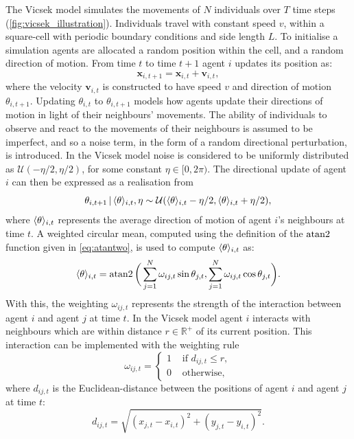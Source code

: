 The Vicsek model simulates the movements of $N$ individuals over $T$ time steps
(\cref{fig:vicsek_illustration}). Individuals travel with constant speed $v$,
within a square-cell with periodic boundary conditions and side length $L$. To
initialise a simulation agents are allocated a random position within the cell,
and a random direction of motion. From time $t$ to time $t+1$ agent $i$ updates
its position as:
\begin{equation}
  \label{eq:positional_update}
  \bm{x}_{i, t+1} = \bm{x}_{i, t} + \bm{v}_{i, t},
\end{equation}
where the velocity $\bm{v}_{i,t}$ is constructed to have speed $v$ and
direction of motion $\theta_{i, t+1}$. Updating $\theta_{i,t}$ to $\theta_{i,
t+1}$ models how agents update their directions of motion in light of their
neighbours' movements. The ability of individuals to observe and react to the
movements of their neighbours is assumed to be imperfect, and so a noise term,
in the form of a random directional perturbation, is introduced. In the Vicsek
model noise is considered to be uniformly distributed as $\mathcal{U}(-\eta/2,
\eta/2)$, for some constant $\eta \in [0, 2\pi)$. The directional update of
agent $i$ can then be expressed as a realisation from
\begin{equation}
  \label{eq:vicsek_update}
  \theta_{i, t+1} \,|\, \langle\theta\rangle_{i, t}, \eta \sim
                 \mathcal{U}(\langle\theta\rangle_{i, t} - \eta/2,
                             \langle\theta\rangle_{i, t} + \eta/2),
\end{equation}
where $\langle\theta\rangle_{i, t}$ represents the average direction of motion of
agent $i$'s neighbours at time $t$. A weighted circular mean, computed using
the definition of the $\operatorname{atan2}$ function given in \cref{eq:atantwo}, is used
to compute $\langle\theta\rangle_{i, t}$ as:
\begin{equation}
  \label{eq:weighted_interaction}
  \langle\theta\rangle_{i, t} = \operatorname{atan2}\bigg(
      \sum_{j=1}^N \omega_{ij, t} \sin\theta_{j,t},
      \sum_{j=1}^N \omega_{ij, t} \cos\theta_{j,t}
  \bigg).
\end{equation}
With this, the weighting $\omega_{ij, t}$ represents the strength of the
interaction between agent $i$ and agent $j$ at time $t$. In the Vicsek model
agent $i$ interacts with neighbours which are within distance
$r\in\mathbb{R}^+$ of its current position. This interaction can be implemented
with the weighting rule
\begin{equation}
  \label{eq:vicsek_interaction}
  \omega_{ij,t} =
  \begin{cases}
    1 & \text{ if } d_{ij, t} \leq r,\\
    0 & \text{ otherwise,}
  \end{cases}
\end{equation}
where $d_{ij,t}$ is the Euclidean-distance between the positions of agent $i$
and agent $j$ at time $t$:
\begin{equation*}
  d_{ij,t} = \sqrt{(x_{j,t} - x_{i,t})^2 + (y_{j,t} - y_{i,t})^2}.
\end{equation*}

